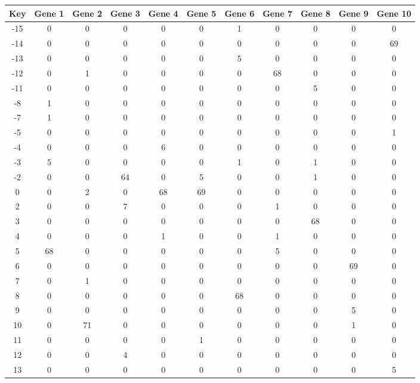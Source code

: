 \begin{tabular}{|c|c|c|c|c|c|c|c|c|c|c|}
\hline
Key & Gene 1 & Gene 2 & Gene 3 & Gene 4 & Gene 5 & Gene 6 & Gene 7 & Gene 8 & Gene 9 & Gene 10 \\
\hline
-15 & 0 & 0 & 0 & 0 & 0 & 1 & 0 & 0 & 0 & 0 \\
-14 & 0 & 0 & 0 & 0 & 0 & 0 & 0 & 0 & 0 & 69 \\
-13 & 0 & 0 & 0 & 0 & 0 & 5 & 0 & 0 & 0 & 0 \\
-12 & 0 & 1 & 0 & 0 & 0 & 0 & 68 & 0 & 0 & 0 \\
-11 & 0 & 0 & 0 & 0 & 0 & 0 & 0 & 5 & 0 & 0 \\
-8 & 1 & 0 & 0 & 0 & 0 & 0 & 0 & 0 & 0 & 0 \\
-7 & 1 & 0 & 0 & 0 & 0 & 0 & 0 & 0 & 0 & 0 \\
-5 & 0 & 0 & 0 & 0 & 0 & 0 & 0 & 0 & 0 & 1 \\
-4 & 0 & 0 & 0 & 6 & 0 & 0 & 0 & 0 & 0 & 0 \\
-3 & 5 & 0 & 0 & 0 & 0 & 1 & 0 & 1 & 0 & 0 \\
-2 & 0 & 0 & 64 & 0 & 5 & 0 & 0 & 1 & 0 & 0 \\
0 & 0 & 2 & 0 & 68 & 69 & 0 & 0 & 0 & 0 & 0 \\
2 & 0 & 0 & 7 & 0 & 0 & 0 & 1 & 0 & 0 & 0 \\
3 & 0 & 0 & 0 & 0 & 0 & 0 & 0 & 68 & 0 & 0 \\
4 & 0 & 0 & 0 & 1 & 0 & 0 & 1 & 0 & 0 & 0 \\
5 & 68 & 0 & 0 & 0 & 0 & 0 & 5 & 0 & 0 & 0 \\
6 & 0 & 0 & 0 & 0 & 0 & 0 & 0 & 0 & 69 & 0 \\
7 & 0 & 1 & 0 & 0 & 0 & 0 & 0 & 0 & 0 & 0 \\
8 & 0 & 0 & 0 & 0 & 0 & 68 & 0 & 0 & 0 & 0 \\
9 & 0 & 0 & 0 & 0 & 0 & 0 & 0 & 0 & 5 & 0 \\
10 & 0 & 71 & 0 & 0 & 0 & 0 & 0 & 0 & 1 & 0 \\
11 & 0 & 0 & 0 & 0 & 1 & 0 & 0 & 0 & 0 & 0 \\
12 & 0 & 0 & 4 & 0 & 0 & 0 & 0 & 0 & 0 & 0 \\
13 & 0 & 0 & 0 & 0 & 0 & 0 & 0 & 0 & 0 & 5 \\
\hline
\end{tabular}